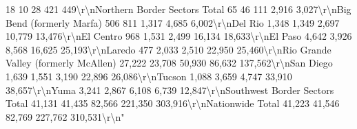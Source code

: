 \documentclass[
  12pt,
]{book}
\newenvironment{Shaded}{\begin{snugshade}}{\end{snugshade}}
\begin{document}
\begin{Shaded}
\begin{Highlighting}[]
          18                       10                   28              421               449\textbackslash{}r\textbackslash{}nNorthern Border Sectors Total                    65                       46                  111             2,916             3,027\textbackslash{}r\textbackslash{}nBig Bend (formerly Marfa)                       506                      811                 1,317           4,685              6,002\textbackslash{}r\textbackslash{}nDel Rio                                        1,348                    1,349                2,697           10,779             13,476\textbackslash{}r\textbackslash{}nEl Centro                                       968                     1,531                2,499           16,134             18,633\textbackslash{}r\textbackslash{}nEl Paso                                        4,642                    3,926                8,568           16,625             25,193\textbackslash{}r\textbackslash{}nLaredo                                          477                     2,033                2,510           22,950             25,460\textbackslash{}r\textbackslash{}nRio Grande Valley (formerly McAllen)          27,222                   23,708                50,930          86,632            137,562\textbackslash{}r\textbackslash{}nSan Diego                                      1,639                    1,551                3,190           22,896             26,086\textbackslash{}r\textbackslash{}nTucson                                         1,088                    3,659                4,747           33,910             38,657\textbackslash{}r\textbackslash{}nYuma                                           3,241                    2,867                6,108           6,739              12,847\textbackslash{}r\textbackslash{}nSouthwest Border Sectors Total                41,131                   41,435                82,566         221,350            303,916\textbackslash{}r\textbackslash{}nNationwide Total                              41,223                   41,546                82,769         227,762            310,531\textbackslash{}r\textbackslash{}n"                                                                                                                                                                                                                                                                                                                                                                                                                                                                                                                                                                                                                                                                                                                                                                                                                                                                                                                                                                                                                                                                                                                                                                                                    
\end{Highlighting}
\end{Shaded}
\end{document}
